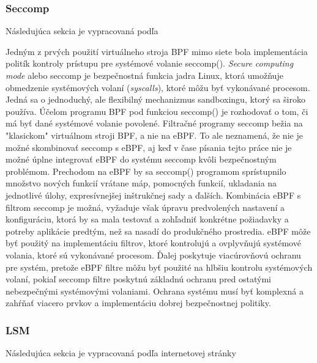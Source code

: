 \subsubsection{Seccomp}
Následujúca sekcia je vypracovaná podľa ~\cite{seccomp}

Jedným z prvých použití virtuálneho stroja BPF mimo siete bola implementácia politík kontroly prístupu pre systémové volanie seccomp(). 
\emph{Secure computing mode} alebo seccomp je bezpečnostná funkcia jadra Linux, ktorá umožňuje obmedzenie systémových volaní (\emph{syscalls}), 
ktoré môžu byť vykonávané procesom. Jedná sa o jednoduchý, ale flexibilný mechanizmus sandboxingu, ktorý sa široko používa. 
Účelom programu BPF pod funkciou seccomp() je rozhodovať o tom, či má byť dané systémové volanie povolené. Filtračné programy 
seccomp bežia na "klasickom" virtuálnom stroji BPF, a nie na eBPF. To ale neznamená, že nie je možné skombinovať seccomp s eBPF, 
aj keď v čase písania tejto práce nie je možné úplne integrovať eBPF do systému seccomp kvôli bezpečnostným problémom. 
Prechodom na eBPF by sa seccomp() programom sprístupnilo množstvo nových funkcií vrátane máp, pomocných funkcií, ukladania na jednotlivé úlohy, 
expresívnejšej inštrukčnej sady a ďalších. Kombinácia eBPF s filtrom seccomp je možná, vyžaduje však úpravu predvolených 
nastavení a konfiguráciu, ktorá by sa mala testovať a zohľadniť konkrétne požiadavky a potreby aplikácie predtým, než sa nasadí do produkčného 
prostredia. eBPF môže byť použitý na implementáciu filtrov, ktoré kontrolujú a ovplyvňujú systémové volania, ktoré sú vykonávané procesom. 
Ďalej poskytuje viacúrovňovú ochranu pre systém, pretože eBPF filtre môžu byť použité na hlbšiu kontrolu systémových volaní, 
pokiaľ seccomp filtre poskytnú základnú ochranu pred ostatými nebezpečnými systémovými volaniami. Ochrana systému musí byť komplexná a zahŕňať viacero prvkov 
a implementáciu dobrej bezpečnostnej politiky.

\subsubsection{LSM}
Následujúca sekcia je vypracovaná podľa internetovej stránky~\cite{lsm,lsm-usage}

